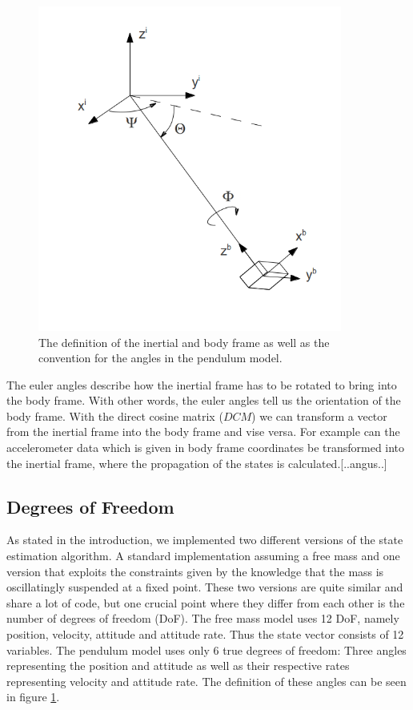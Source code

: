  \begin{figure}[h]
\begin{center}
\includegraphics[width=10cm]{pictures/sketch_coordinate_systems.png}
\caption{The definition of the inertial and body frame as well as the convention for the angles in the pendulum model.}
\label{dof}
\end{center}
\end{figure}

The euler angles describe how the inertial frame has to be rotated to bring into the body frame. With other words, the euler angles tell us the orientation of the body frame. With the direct cosine matrix ($DCM$) we can transform a vector from the inertial frame into the body frame and vise versa. For example can the accelerometer data which is given in body frame coordinates be transformed into the inertial frame, where the propagation of the states is calculated.[..angus..]

\subsection*{Degrees of Freedom}
As stated in the introduction, we implemented two different versions of the state estimation algorithm. A standard implementation assuming a free mass and one version that exploits the constraints given by the knowledge that the mass is oscillatingly suspended at a fixed point. These two versions are quite similar and share a lot of code, but one crucial point where they differ from each other is the number of degrees of freedom (DoF). The free mass model uses 12 DoF, namely position, velocity, attitude and attitude rate. Thus the state vector consists of 12 variables. The pendulum model uses only 6 true degrees of freedom: Three angles representing the position and attitude as well as their respective rates representing velocity and attitude rate. The definition of these angles can be seen in figure \ref{dof}.



